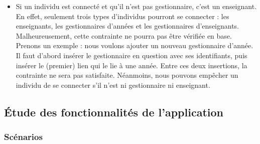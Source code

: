 \documentclass{article}
\begin{document}
\begin{itemize}
\item Si un individu est connecté et qu'il n'est pas gestionnaire, c'est un enseignant. En effet, seulement trois types d'individus pourront se connecter : les enseignants, les gestionnaires d'années et les gestionnaires d'enseignants. Malheureusement, cette contrainte ne pourra pas être vérifiée en base. Prenons un exemple : nous voulons ajouter un nouveau gestionnaire d'année. Il faut d'abord insérer le gestionnaire en question avec ses identifiants, puis insérer le (premier) lien qui le lie à une année. Entre ces deux insertions, la contrainte ne sera pas satisfaite. Néanmoins, nous pouvons empêcher un individu de se connecter s'il n'est ni gestionnaire ni enseignant.

\end{itemize}

\subsection{\'Etude des fonctionnalités de l'application}

\subsubsection{Scénarios}
\end{document}
